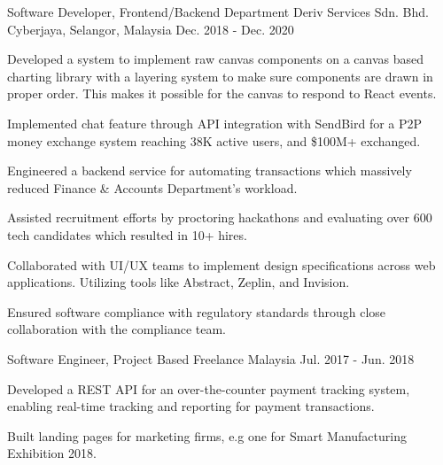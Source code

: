 \begin{cventries}
  \cventry
    {Software Developer, Frontend/Backend Department} %
    {Deriv Services Sdn. Bhd.} %
    {Cyberjaya, Selangor, Malaysia} %
    {Dec. 2018 - Dec. 2020} %
    {
      \begin{cvitems} %
        \item {Developed a system to implement raw canvas components on a canvas based charting library with a layering system to make sure components are drawn in proper order. This makes it possible for the canvas to respond to React events.}
        \item {Implemented chat feature through API integration with SendBird for a P2P money exchange system reaching 38K active users, and \$100M+ exchanged.}
        \item {Engineered a backend service for automating transactions which massively reduced Finance \& Accounts Department's workload.}
        \item {Assisted recruitment efforts by proctoring hackathons and evaluating over 600 tech candidates which resulted in 10+ hires.}
        \item {Collaborated with UI/UX teams to implement design specifications across web applications. Utilizing tools like Abstract, Zeplin, and Invision.}
        \item {Ensured software compliance with regulatory standards through close collaboration with the compliance team.}
      \end{cvitems}
    }

  \cventry
    {Software Engineer, Project Based} %
    {Freelance} %
    {Malaysia} %
    {Jul. 2017 - Jun. 2018} %
    {
      \begin{cvitems} %
        \item {Developed a REST API for an over-the-counter payment tracking system, enabling real-time tracking and reporting for payment transactions.}
        \item {Built landing pages for marketing firms, e.g one for Smart Manufacturing Exhibition 2018.}
      \end{cvitems}
    }

\end{cventries}
